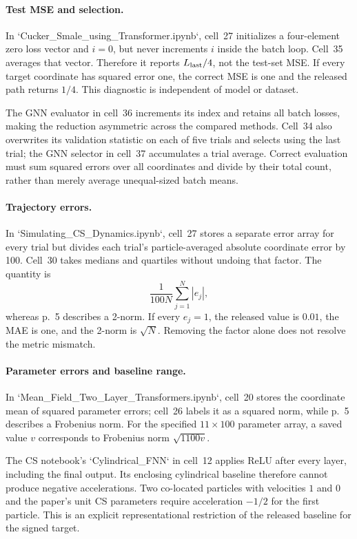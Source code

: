 \documentclass[10pt]{article}
\begin{document}
\paragraph*{Test MSE and selection.}\mbox{}\par
In `Cucker\_Smale\_using\_Transformer.ipynb`, cell 27 initializes a four-element zero loss vector and \(i=0\), but never increments \(i\) inside the batch loop. Cell 35 averages that vector. Therefore it reports \(L_{\rm last}/4\), not the test-set MSE. If every target coordinate has squared error one, the correct MSE is one and the released path returns \(1/4\). This diagnostic is independent of model or dataset.\par
The GNN evaluator in cell 36 increments its index and retains all batch losses, making the reduction asymmetric across the compared methods. Cell 34 also overwrites its validation statistic on each of five trials and selects using the last trial; the GNN selector in cell 37 accumulates a trial average. Correct evaluation must sum squared errors over all coordinates and divide by their total count, rather than merely average unequal-sized batch means.\par
\paragraph*{Trajectory errors.}\mbox{}\par
In `Simulating\_CS\_Dynamics.ipynb`, cell 27 stores a separate error array for every trial but divides each trial’s particle-averaged absolute coordinate error by 100. Cell 30 takes medians and quartiles without undoing that factor. The quantity is \[\frac1{100N}\sum_{j=1}^{N}|e_j|,\] whereas p. 5 describes a 2-norm. If every \(e_j=1\), the released value is \(0.01\), the MAE is one, and the 2-norm is \(\sqrt N\). Removing the factor alone does not resolve the metric mismatch.\par
\paragraph*{Parameter errors and baseline range.}\mbox{}\par
In `Mean\_Field\_Two\_Layer\_Transformers.ipynb`, cell 20 stores the coordinate mean of squared parameter errors; cell 26 labels it as a squared norm, while p. 5 describes a Frobenius norm. For the specified \(11\times100\) parameter array, a saved value \(v\) corresponds to Frobenius norm \(\sqrt{1100v}\).\par
The CS notebook’s `Cylindrical\_FNN` in cell 12 applies ReLU after every layer, including the final output. Its enclosing cylindrical baseline therefore cannot produce negative accelerations. Two co-located particles with velocities \(1\) and \(0\) and the paper’s unit CS parameters require acceleration \(-1/2\) for the first particle. This is an explicit representational restriction of the released baseline for the signed target.\par
\end{document}
